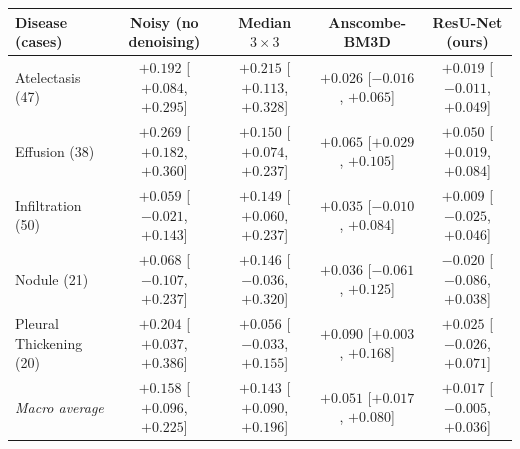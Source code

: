 \begin{tabular}{@{}lcccc@{}}
\toprule
\textbf{Disease (cases)} & \textbf{Noisy (no denoising)} & \textbf{Median $3\times3$} & \textbf{Anscombe-BM3D} & \textbf{ResU-Net (ours)} \\
\midrule
Atelectasis (47) & $+0.192$ [$+0.084$, $+0.295$] & $+0.215$ [$+0.113$, $+0.328$] & $+0.026$ [$-0.016$, $+0.065$] & $+0.019$ [$-0.011$, $+0.049$] \\
Effusion (38) & $+0.269$ [$+0.182$, $+0.360$] & $+0.150$ [$+0.074$, $+0.237$] & $+0.065$ [$+0.029$, $+0.105$] & $+0.050$ [$+0.019$, $+0.084$] \\
Infiltration (50) & $+0.059$ [$-0.021$, $+0.143$] & $+0.149$ [$+0.060$, $+0.237$] & $+0.035$ [$-0.010$, $+0.084$] & $+0.009$ [$-0.025$, $+0.046$] \\
Nodule (21) & $+0.068$ [$-0.107$, $+0.237$] & $+0.146$ [$-0.036$, $+0.320$] & $+0.036$ [$-0.061$, $+0.125$] & $-0.020$ [$-0.086$, $+0.038$] \\
Pleural Thickening (20) & $+0.204$ [$+0.037$, $+0.386$] & $+0.056$ [$-0.033$, $+0.155$] & $+0.090$ [$+0.003$, $+0.168$] & $+0.025$ [$-0.026$, $+0.071$] \\
\midrule
\textit{Macro average} & $+0.158$ [$+0.096$, $+0.225$] & $+0.143$ [$+0.090$, $+0.196$] & $+0.051$ [$+0.017$, $+0.080$] & $+0.017$ [$-0.005$, $+0.036$] \\
\bottomrule
\end{tabular}
